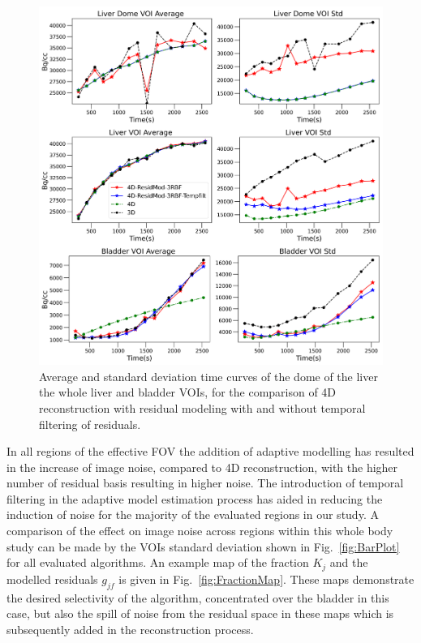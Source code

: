 \begin{figure} [!htbp]
\centering
\includegraphics[scale=0.74 ,angle=0]{3_Results/3_4_Residual/figures/TACsFilt.png}
\caption{Average and standard deviation time curves of the dome of the liver the whole liver and bladder VOIs, for the comparison of 4D reconstruction with residual modeling with and without temporal filtering of residuals.} 
\label{fig:TACsFilt}
\end{figure}

In all regions of the effective FOV the addition of adaptive modelling has resulted in the increase of image noise, compared to 4D reconstruction, with the higher number of residual basis resulting in higher noise. The introduction of temporal filtering in the adaptive model estimation process has aided in reducing the induction of noise for the majority of the evaluated regions in our study. 
A comparison of the effect on image noise across regions within this whole body study can be made by the VOIs standard deviation shown in Fig.~\ref{fig:BarPlot} for all evaluated algorithms.
An example map of the fraction $K_{j}$ and the modelled residuals $g_{jf}$ is given in Fig.~\ref{fig:FractionMap}. These maps demonstrate the desired selectivity of the algorithm, concentrated over the bladder in this case, but also the
spill of noise from the residual space in these maps which is subsequently added in the reconstruction process.

